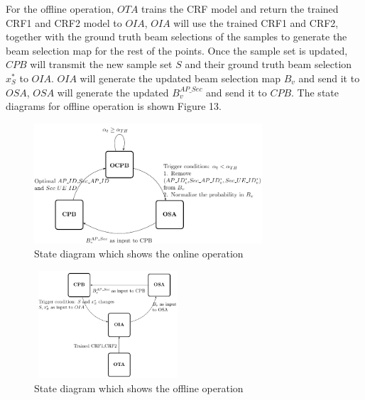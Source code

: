 \documentclass[conference]{IEEEtran}
\begin{document}
For the offline operation, $OTA$ trains the CRF model and return the trained CRF1 and CRF2 model to $OIA$, $OIA$ will use the trained CRF1 and CRF2, together with the ground truth beam selections of the samples to generate the beam selection map for the rest of the points. Once the sample set is updated, $CPB$ will transmit the new sample set $S$ and their ground truth beam selection $x_{S}^{*}$ to $OIA$. $OIA$ will generate the updated beam selection map $B_{v}$ and send it to $OSA$, $OSA$ will generate the updated $B^{AP\_Sec}_{v}$ and send it to $CPB$. The state diagrams for offline operation is shown Figure 13.
\begin{figure}
	\centerline{\includegraphics[width=8.5cm,height=4.5cm]{online_state_diagram}}
	\caption[U-example]{State diagram which shows the online operation}
\end{figure}
\begin{figure}
	\centerline{\includegraphics[width=5.5cm,height=4cm]{offline_state_diagram}}
	\caption[U-example]{State diagram which shows the offline operation}
\end{figure}
\end{document}
